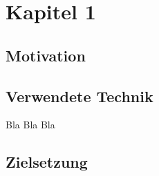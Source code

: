 \chapter{Kapitel 1}

\section{Motivation}

\section{Verwendete Technik}
Bla Bla Bla
\section{Zielsetzung}
